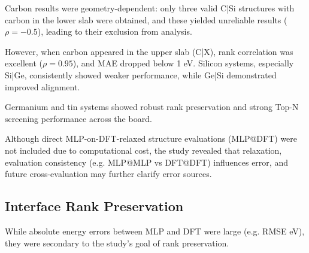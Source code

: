 
Carbon results were geometry-dependent: only three valid C|Si structures with carbon in the lower slab were obtained,
and these yielded unreliable results ($\rho = -0.5$), leading to their exclusion from analysis.

However, when carbon appeared in the upper slab (C|X), rank correlation was excellent ($\rho = 0.95$), and MAE dropped
below 1 eV. Silicon systems, especially Si|Ge, consistently showed weaker performance, while Ge|Si demonstrated improved
alignment.

Germanium and tin systems showed robust rank preservation and strong Top-N screening performance across the board.




Although direct MLP-on-DFT-relaxed structure evaluations (MLP@DFT) were not included due to computational cost, the
study revealed that relaxation, evaluation consistency (e.g. MLP@MLP vs DFT@DFT) influences error, and future
cross-evaluation may further clarify error sources.




\subsection{Interface Rank Preservation} \label{section:interface_rank_preservation}


While absolute energy errors between MLP and DFT were large (e.g. RMSE  eV), they were secondary to the study's
goal of rank preservation.


